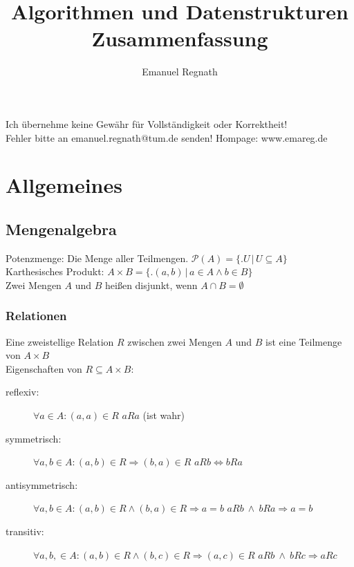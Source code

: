 \documentclass[10pt,a4paper]{scrartcl}
\title{Algorithmen und Datenstrukturen Zusammenfassung}
\author{Emanuel Regnath}
\newcommand{\iset}[2]{\ensuremath{\bigl\{ \bigl. #1 \, \bigr| \, #2 \bigr\}}}	%
\begin{document}
\maketitle


Ich übernehme keine Gewähr für Vollständigkeit oder Korrektheit!\\
Fehler bitte an emanuel.regnath@tum.de senden! Hompage: www.emareg.de\\



\section{Allgemeines}

\subsection{Mengenalgebra}
Potenzmenge: Die Menge aller Teilmengen. $\mathcal P(A) = \iset{U}{U \subseteq A}$\\
Karthesisches Produkt: $A \times B = \iset{(a,b)}{a \in A \land b \in B}$\\
Zwei Mengen $A$ und $B$ heißen disjunkt, wenn $A \cap B = \emptyset$\\

\subsubsection{Relationen}
Eine zweistellige Relation $R$ zwischen zwei Mengen $A$ und $B$ ist eine Teilmenge von $A \times B$\\
Eigenschaften von $R \subseteq A \times B$:
\begin{description}
	\item[reflexiv:] $\forall a \in A: (a,a)\in R$	\qquad $aRa$ (ist wahr) 
	\item[symmetrisch:] $\forall a,b \in A:(a,b) \in R \Rightarrow (b,a) \in R$ \qquad $aRb \Leftrightarrow bRa$
	\item[antisymmetrisch:] $\forall a,b \in A:(a,b) \in R \land (b,a) \in R \Rightarrow a=b$ \qquad $aRb \ \land \ bRa \Rightarrow a=b$
	\item[transitiv:] $\forall a,b, \in A:(a,b) \in R\land (b,c) \in R \Rightarrow (a,c) \in R$ \qquad $aRb \ \land \ bRc \Rightarrow aRc$
\end{description}
\end{document}
